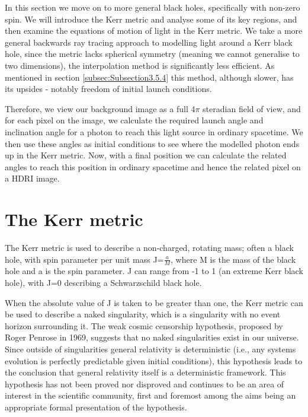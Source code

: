\documentclass[oneside,openright,frontopenright, singlespacing]{dmathesis}
\begin{document}
	In this section we move on to more general black holes, specifically with non-zero spin. We will introduce the Kerr metric and analyse some of its key regions, and then examine the equations of motion of light in the Kerr metric. We take a more general backwards ray tracing approach to modelling light around a Kerr black hole, since the metric lacks spherical symmetry (meaning we cannot generalise to two dimensions), the interpolation method is significantly less efficient. As mentioned in section \ref{subsec:Subsection3.5.4} this method, although slower, has its upsides - notably freedom of initial launch conditions.
	
\vspace{1em}
	Therefore, we view our background image as a full 4$\pi$ steradian field of view, and for each pixel on the image, we calculate the required launch angle and inclination angle for a photon to reach this light source in ordinary spacetime. We then use these angles as initial conditions to see where the modelled photon ends up in the Kerr metric. Now, with a final position we can calculate the related angles to reach this position in ordinary spacetime and hence the related pixel on a HDRI image.

\section{The Kerr metric}\label{sec:Section4.1}

	The Kerr metric is used to describe a non-charged, rotating mass; often a black hole, with spin parameter per unit mass J=$\frac{a}{M}$, where M is the mass of the black hole and a is the spin parameter. J can range from -1 to 1 (an extreme Kerr black hole), with J=0 describing a Schwarzschild black hole.

\vspace{1em}
	When the absolute value of J is taken to be greater than one, the Kerr metric can be used to describe a naked singularity, which is a singularity with no event horizon surrounding it. The weak cosmic censorship hypothesis, proposed by Roger Penrose in 1969\cite{penrose1969gravitational}, suggests that no naked singularities exist in our universe. Since outside of singularities general relativity is deterministic (i.e., any systems evolution is perfectly predictable given initial conditions), this hypothesis leads to the conclusion that general relativity itself is a deterministic framework. This hypothesis has not been proved nor disproved and continues to be an area of interest in the scientific community, first and foremost among the aims being an appropriate formal presentation of the hypothesis.
\end{document}
